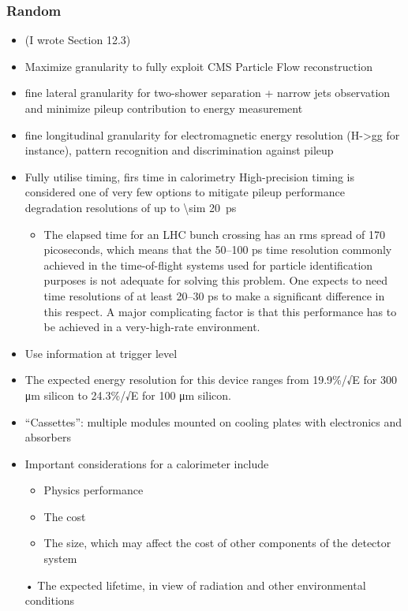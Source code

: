 \documentclass[11pt]{article}
\begin{document}
\subsubsection{Random}
\label{sec:orgab98205}
\begin{itemize}
\item \cite{hlttdr} (I wrote Section 12.3)
\item Maximize granularity to fully exploit CMS Particle Flow reconstruction
\item fine lateral granularity for two-shower separation + narrow jets observation and minimize pileup contribution to energy measurement
\item fine longitudinal granularity for electromagnetic energy resolution (H->gg for instance), pattern recognition and discrimination against pileup
\item Fully utilise timing, firs time in calorimetry High-precision timing is considered one of very few options to mitigate pileup performance degradation \cite{wigmans2} resolutions of up to \SI{\sim 20}{\pico\second} \cite{calorimetry_fabjan}
\begin{itemize}
\item The elapsed time for an LHC bunch crossing has an rms spread of 170 picoseconds, which means that the 50–100 ps time resolution commonly achieved in the time-of-flight systems used for particle identification purposes is not adequate for solving this problem. One expects to need time resolutions of at least 20–30 ps to make a significant difference in this respect. A major complicating factor is that this performance has to be achieved in a very-high-rate environment.
\end{itemize}
\item Use information at trigger level
\item The expected energy resolution for this device ranges from 19.9\%/√E for 300 μm silicon to 24.3\%/√E for 100 μm silicon. \cite{wigmans2}
\item ``Cassettes'': multiple modules mounted on cooling plates with electronics and absorbers
\item Important considerations for a calorimeter include
\begin{itemize}
\item Physics performance
\item The cost
\item The size, which may affect the cost of other components of the detector system
\end{itemize}
• The expected lifetime, in view of radiation and other environmental conditions
\end{itemize}
\end{document}
